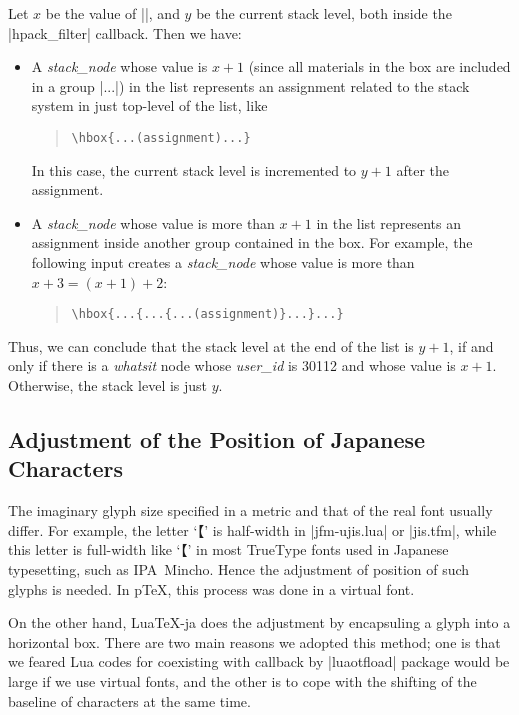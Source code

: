 \documentclass{ajt}
\begin{document}
Let $x$ be the value of |\currentgrouplevel|, and $y$ be the current
stack level, both inside the |hpack_filter| callback. Then we have:
\begin{itemize}
\item A \emph{stack\_node} whose value is $x+1$ (since all materials in
      the box are included in a group |\hbox{...}|) in the list
      represents an assignment related to the stack system in just
      top-level of the list, like
\begin{quote}
\begin{verbatim}
\hbox{...(assignment)...}
\end{verbatim}
\end{quote}
In this case, the current stack level is incremented to $y+1$ after the assignment.
\item A \emph{stack\_node} whose value is more than  $x+1$ in the list represents
an assignment inside another group contained in the box. For example,
      the following input creates
a \emph{stack\_node} whose value is more than  $x+3=(x+1)+2$:
\begin{quote}
\begin{verbatim}
\hbox{...{...{...(assignment)}...}...}
\end{verbatim}
\end{quote}
\end{itemize}
Thus, we can conclude that the stack
level at the end of the list is $y+1$, if and only if there is a
\emph{whatsit} node whose \emph{user\_id} is 30112 and whose value is
$x+1$. Otherwise, the stack level is just $y$.

\subsection{Adjustment of the Position of Japanese Characters}
\label{ssec-width}

The imaginary glyph size specified in a metric and that of the real font
usually differ. For example, the letter `\inhibitglue【' is half-width
in |jfm-ujis.lua| or |jis.tfm|, while
this letter is full-width like `【' in most TrueType fonts used in
Japanese typesetting, such as IPA~Mincho. Hence the adjustment of
position of such glyphs is needed. In p\TeX, this process was done in a virtual font.

On the other hand, Lua\TeX-ja does the adjustment by encapsuling a glyph
into a horizontal box.  There are two main reasons we adopted this
method; one is that we feared Lua codes for coexisting with callback by
|luaotfload| package would be large if we use virtual fonts, and the
other is to cope with the shifting of the baseline of characters at the
same time. 
\end{document}

